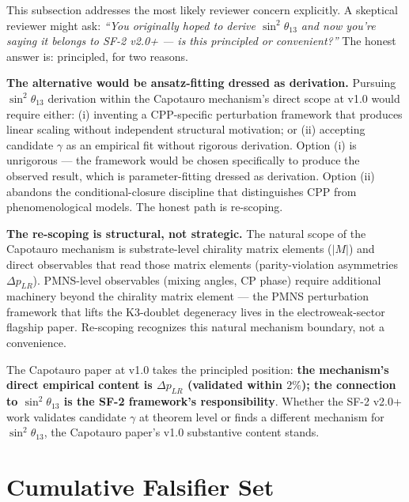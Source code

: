 \documentclass[11pt,letterpaper]{article}
\newcommand{\DeltapLR}{\Delta p_{LR}}
\begin{document}
This subsection addresses the most likely reviewer concern explicitly. A skeptical reviewer might ask: \emph{``You originally hoped to derive $\sin^2\theta_{13}$ and now you're saying it belongs to SF-2 v2.0+ --- is this principled or convenient?''} The honest answer is: principled, for two reasons.

\textbf{The alternative would be ansatz-fitting dressed as derivation.} Pursuing $\sin^2\theta_{13}$ derivation within the Capotauro mechanism's direct scope at v1.0 would require either: (i) inventing a CPP-specific perturbation framework that produces linear scaling without independent structural motivation; or (ii) accepting candidate $\gamma$ as an empirical fit without rigorous derivation. Option (i) is unrigorous --- the framework would be chosen specifically to produce the observed result, which is parameter-fitting dressed as derivation. Option (ii) abandons the conditional-closure discipline that distinguishes CPP from phenomenological models. The honest path is re-scoping.

\textbf{The re-scoping is structural, not strategic.} The natural scope of the Capotauro mechanism is substrate-level chirality matrix elements ($|M|$) and direct observables that read those matrix elements (parity-violation asymmetries $\DeltapLR$). PMNS-level observables (mixing angles, CP phase) require additional machinery beyond the chirality matrix element --- the PMNS perturbation framework that lifts the K3-doublet degeneracy lives in the electroweak-sector flagship paper. Re-scoping recognizes this natural mechanism boundary, not a convenience.

The Capotauro paper at v1.0 takes the principled position: \textbf{the mechanism's direct empirical content is $\DeltapLR$ (validated within $2\%$); the connection to $\sin^2\theta_{13}$ is the SF-2 framework's responsibility}. Whether the SF-2 v2.0+ work validates candidate $\gamma$ at theorem level or finds a different mechanism for $\sin^2\theta_{13}$, the Capotauro paper's v1.0 substantive content stands.

\section{Cumulative Falsifier Set}\label{sec:falsifier}
\end{document}
